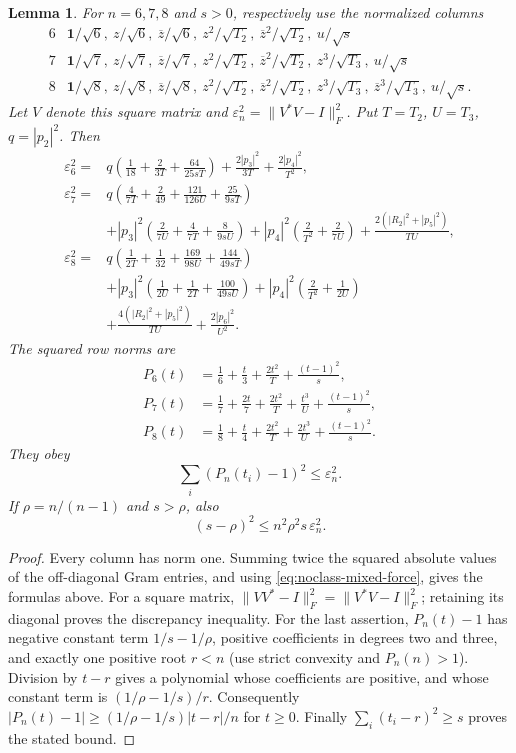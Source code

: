 \documentclass[11pt]{article}
\newtheorem{lemma}[theorem]{Lemma}
\theoremstyle{remark}
\numberwithin{equation}{section}
\begin{document}
\begin{lemma}\label{lem:noclass-fourier-frame}
For $n=6,7,8$ and $s>0$, respectively use the normalized columns
\[
 \begin{array}{c|l}
6&\mathbf1/\sqrt6,\ z/\sqrt6,\ \overline z/\sqrt6,\
 z^2/\sqrt{T_2},\ \overline z^2/\sqrt{T_2},\ u/\sqrt s\\
7&\mathbf1/\sqrt7,\ z/\sqrt7,\ \overline z/\sqrt7,\
 z^2/\sqrt{T_2},\ \overline z^2/\sqrt{T_2},\
 z^3/\sqrt{T_3},\ u/\sqrt s\\
8&\mathbf1/\sqrt8,\ z/\sqrt8,\ \overline z/\sqrt8,\
 z^2/\sqrt{T_2},\ \overline z^2/\sqrt{T_2},\
 z^3/\sqrt{T_3},\ \overline z^3/\sqrt{T_3},\ u/\sqrt s .
 \end{array}
\]
Let $V$ denote this square matrix and
$\varepsilon_n^2=\|V^*V-I\|_F^2$. Put $T=T_2$, $U=T_3$, $q=|p_2|^2$.
Then
\[
\begin{aligned}
\varepsilon_6^2={}&q\left(\frac1{18}+\frac2{3T}+\frac{64}{25sT}\right)
 +\frac{2|p_3|^2}{3T}+\frac{2|p_4|^2}{T^2},\\
\varepsilon_7^2={}&q\left(\frac4{7T}+\frac2{49}
                  +\frac{121}{126U}+\frac{25}{9sT}\right)\\
 &+|p_3|^2\left(\frac2{7U}+\frac4{7T}+\frac8{9sU}\right)
  +|p_4|^2\left(\frac2{T^2}+\frac2{7U}\right)
  +\frac{2(|R_2|^2+|p_5|^2)}{TU},\\
\varepsilon_8^2={}&q\left(\frac1{2T}+\frac1{32}
                  +\frac{169}{98U}+\frac{144}{49sT}\right)\\
 &+|p_3|^2\left(\frac1{2U}+\frac1{2T}+\frac{100}{49sU}\right)
  +|p_4|^2\left(\frac2{T^2}+\frac1{2U}\right)\\
 &+\frac{4(|R_2|^2+|p_5|^2)}{TU}
  +\frac{2|p_6|^2}{U^2}.
\end{aligned}
\]
The squared row norms are
\[
\begin{aligned}
 P_6(t)&=\frac16+\frac t3+\frac{2t^2}{T}+\frac{(t-1)^2}{s},\\
 P_7(t)&=\frac17+\frac{2t}7+\frac{2t^2}{T}
                   +\frac{t^3}{U}+\frac{(t-1)^2}{s},\\
 P_8(t)&=\frac18+\frac t4+\frac{2t^2}{T}
                   +\frac{2t^3}{U}+\frac{(t-1)^2}{s}.
\end{aligned}
\]
They obey
\[
                    \sum_i(P_n(t_i)-1)^2\le\varepsilon_n^2.
\]
If $\rho=n/(n-1)$ and $s>\rho$, also
\[
                 (s-\rho)^2\le n^2\rho^2s\,\varepsilon_n^2.
\]
\end{lemma}
\begin{proof}
Every column has norm one. Summing twice the squared absolute
values of the off-diagonal Gram entries, and using
\eqref{eq:noclass-mixed-force}, gives the formulas above.
For a square matrix,
$\|VV^*-I\|_F^2=\|V^*V-I\|_F^2$; retaining its diagonal proves
the discrepancy inequality.
For the last assertion, $P_n(t)-1$ has negative constant term
$1/s-1/\rho$, positive coefficients in degrees two and three,
and exactly one positive root $r<n$ (use strict convexity and
$P_n(n)>1$). Division by $t-r$ gives a polynomial whose coefficients
are positive, and whose constant term is $(1/\rho-1/s)/r$.
Consequently
$|P_n(t)-1|\ge(1/\rho-1/s)|t-r|/n$ for $t\ge0$.
Finally $\sum_i(t_i-r)^2\ge s$ proves the stated bound.
\end{proof}
\end{document}
